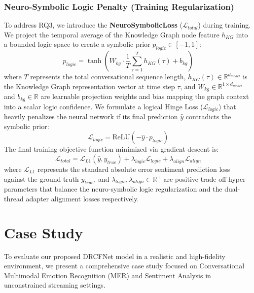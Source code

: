 \documentclass[sn-mathphys,Numbered]{sn-jnl}
\theoremstyle{thmstyleone}
\theoremstyle{thmstyletwo}
\theoremstyle{thmstylethree}
\begin{document}
\subsubsection{Neuro-Symbolic Logic Penalty (Training Regularization)}
To address RQ3, we introduce the \textbf{NeuroSymbolicLoss} ($\mathcal{L}_{total}$) during training. We project the temporal average of the Knowledge Graph node feature $h_{KG}$ into a bounded logic space to create a symbolic prior $p_{logic} \in [-1, 1]$:
\begin{equation}
    p_{logic} = \tanh\left(W_{kg} \cdot \frac{1}{T} \sum_{\tau=1}^T h_{KG}(\tau) + b_{kg}\right)
\end{equation}
where $T$ represents the total conversational sequence length, $h_{KG}(\tau) \in \mathbb{R}^{d_{model}}$ is the Knowledge Graph representation vector at time step $\tau$, and $W_{kg} \in \mathbb{R}^{1 \times d_{model}}$ and $b_{kg} \in \mathbb{R}$ are learnable projection weights and bias mapping the graph context into a scalar logic confidence. We formulate a logical Hinge Loss ($\mathcal{L}_{logic}$) that heavily penalizes the neural network if its final prediction $\hat{y}$ contradicts the symbolic prior:
\begin{equation}
    \mathcal{L}_{logic} = \text{ReLU}(-\hat{y} \cdot p_{logic})
\end{equation}
The final training objective function minimized via gradient descent is:
\begin{equation}
    \mathcal{L}_{total} = \mathcal{L}_{L1}(\hat{y}, y_{true}) + \lambda_{logic} \mathcal{L}_{logic} + \lambda_{align} \mathcal{L}_{align}
\end{equation}
where $\mathcal{L}_{L1}$ represents the standard absolute error sentiment prediction loss against the ground truth $y_{true}$, and $\lambda_{logic}, \lambda_{align} \in \mathbb{R}^+$ are positive trade-off hyper-parameters that balance the neuro-symbolic logic regularization and the dual-thread adapter alignment losses respectively.

\section{Case Study}\label{sec:case}

To evaluate our proposed DRCFNet model in a realistic and high-fidelity environment, we present a comprehensive case study focused on Conversational Multimodal Emotion Recognition (MER) and Sentiment Analysis in unconstrained streaming settings. 
\end{document}
